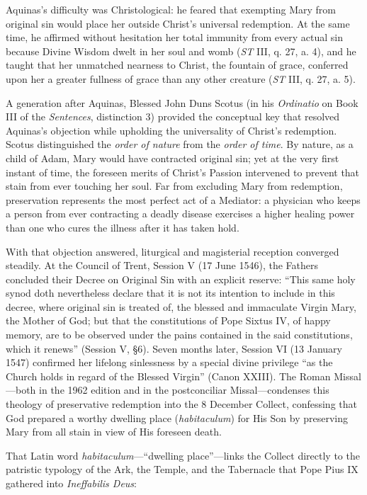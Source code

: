 Aquinas's difficulty was Christological: he feared that exempting Mary from original sin would place her outside Christ's universal redemption. At the same time, he affirmed without hesitation her total immunity from every actual sin because Divine Wisdom dwelt in her soul and womb (\textit{ST} III, q. 27, a. 4), and he taught that her unmatched nearness to Christ, the fountain of grace, conferred upon her a greater fullness of grace than any other creature (\textit{ST} III, q. 27, a. 5).

A generation after Aquinas, Blessed John Duns Scotus (in his \textit{Ordinatio} on Book III of the \textit{Sentences}, distinction 3) provided the conceptual key that resolved Aquinas's objection while upholding the universality of Christ's redemption. Scotus distinguished the \textit{order of nature} from the \textit{order of time}. By nature, as a child of Adam, Mary would have contracted original sin; yet at the very first instant of time, the foreseen merits of Christ's Passion intervened to prevent that stain from ever touching her soul. Far from excluding Mary from redemption, preservation represents the most perfect act of a Mediator: a physician who keeps a person from ever contracting a deadly disease exercises a higher healing power than one who cures the illness after it has taken hold.

With that objection answered, liturgical and magisterial reception converged steadily. At the Council of Trent, Session V (17 June 1546), the Fathers concluded their Decree on Original Sin with an explicit reserve: ``This same holy synod doth nevertheless declare that it is not its intention to include in this decree, where original sin is treated of, the blessed and immaculate Virgin Mary, the Mother of God; but that the constitutions of Pope Sixtus IV, of happy memory, are to be observed under the pains contained in the said constitutions, which it renews'' (Session V, \S 6). Seven months later, Session VI (13 January 1547) confirmed her lifelong sinlessness by a special divine privilege ``as the Church holds in regard of the Blessed Virgin'' (Canon XXIII). The Roman Missal---both in the 1962 edition and in the postconciliar Missal---condenses this theology of preservative redemption into the 8 December Collect, confessing that God prepared a worthy dwelling place (\textit{habitaculum}) for His Son by preserving Mary from all stain in view of His foreseen death.

That Latin word \textit{habitaculum}---``dwelling place''---links the Collect directly to the patristic typology of the Ark, the Temple, and the Tabernacle that Pope Pius IX gathered into \textit{Ineffabilis Deus}:

